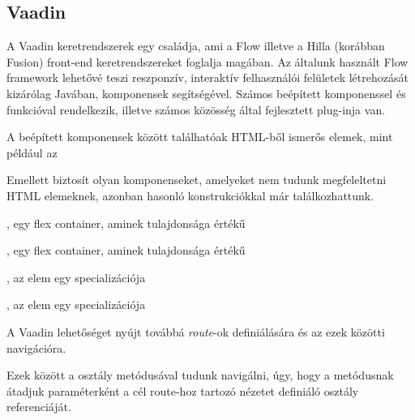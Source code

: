 \subsection{Vaadin}

A Vaadin keretrendszerek egy családja, ami a Flow illetve a Hilla (korábban Fusion) front-end keretrendszereket foglalja magában. Az általunk használt Flow framework lehetővé teszi reszponzív, interaktív felhasználói felületek létrehozását kizárólag Javában, komponensek segítségével. Számos beépített komponenssel és funkcióval rendelkezik, illetve számos közösség által fejlesztett plug-inja van. \par

A beépített komponensek között találhatóak HTML-ből ismerős elemek, mint például az

\begin{listing}
	\item {}
	\item {}
	\item {}
	\item {}
	\item {}
	\item {}
\end{listing}

Emellett biztosít olyan komponenseket, amelyeket nem tudunk megfeleltetni HTML elemeknek, azonban hasonló konstrukciókkal már találkozhattunk.

\begin{listing}
	\item {}, egy flex container, aminek  tulajdonsága  értékű 
	\item {}, egy flex container, aminek  tulajdonsága  értékű 
	\item {}, az  elem egy specializációja
	\item {}, az  elem egy specializációja
\end{listing}

A Vaadin lehetőséget nyújt továbbá \emph{route}-ok definiálására és az ezek közötti navigációra.


Ezek között a  osztály  metódusával tudunk navigálni, úgy, hogy a metódusnak átadjuk paraméterként a cél route-hoz tartozó nézetet definiáló osztály referenciáját.

